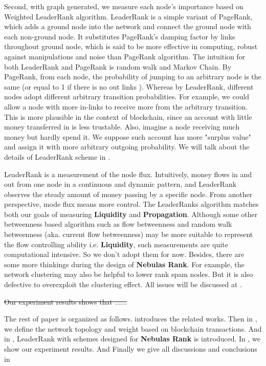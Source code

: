 Second, with graph generated, we measure each node's importance based on Weighted LeaderRank algorithm\cite{Chen2013}\cite{Li2014}. LeaderRank is a simple variant of PageRank, which adds a ground node into the network and connect the ground node with each non-ground node. It substitutes PageRank's damping factor by links throughout ground node, which is said to be more effective in computing, robust against manipulations and noise than PageRank algorithm\cite{Chen2013}. The intuition for both LeaderRank and PageRank is random walk and Markov Chain. By PageRank, from each node, the probability of jumping to an arbitrary node is the same (or equal to 1 if there is no out links \cite{Kim2002}). Whereas by LeaderRank\cite{Li2014}\cite{Chen2013}, different nodes adopt different arbitrary transition probabilities. For example, we could allow a node with more in-links to receive more from the arbitrary transition. This is more plausible in the context of blockchain, since an account with little money transferred in is less trustable. Also, imagine a node receiving much money but hardly spend it. We suppose such account has more "surplus value" and assign it with more arbitrary outgoing probability. We will talk about the details of LeaderRank scheme in .

LeaderRank is a measurement of the node flux. Intuitively, money flows in and out from one node in a continuous and dynamic pattern, and LeaderRank observes the steady amount of money passing by a specific node. From another perspective, mode flux means more control. The LeaderRanks algorithm matches both our goals of measuring \textbf{Liquidity} and \textbf{Propagation}. Although some other betweenness based algorithm such as flow betweenness\cite{} and random walk betweenness (aka. current flow betweenness)\cite{} may be more suitable to represent the flow controlling ability i.e. \textbf{Liquidity}, such measurements are quite computational intensive. So we don't adopt them for now. Besides, there are some more thinkings during the design of \textbf{Nebulas Rank}. For example, the network clustering may also be helpful to lower rank spam nodes\cite{}. But it is also defective to overexploit the clustering effect. All issues will be discussed at .

\st{Our experiment results shows that ...... }

The rest of paper is organized as follows.  introduces the related works. Then in , we define the network topology and weight based on blockchain transactions. And in , LeaderRank with schemes designed for \textbf{Nebulas Rank} is introduced. In , we show our experiment results. And Finally we give all discussions and conclusions in 

